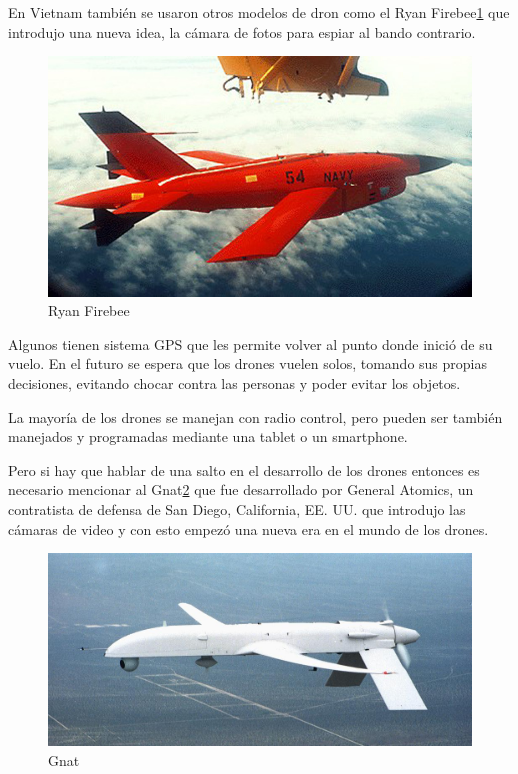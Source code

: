En Vietnam también se usaron otros modelos de dron como el Ryan Firebee\ref{fig:ryanfirebee} que introdujo una nueva idea, la cámara de fotos para espiar al bando contrario.

\begin{figure}[H]
  \centering
  \includegraphics[scale=0.65]{imagenes/ryanfirebee.jpg}
  \caption{Ryan Firebee}
  \label{fig:ryanfirebee}
\end{figure}

Algunos tienen sistema GPS que les permite volver al punto donde inició de su vuelo. En el futuro se espera que los drones vuelen solos, tomando sus propias decisiones, evitando chocar contra las personas y poder evitar los objetos.

La mayoría de los drones se manejan con radio control, pero pueden ser también manejados y programadas mediante una tablet o un smartphone.

Pero si hay que hablar de una salto en el desarrollo de los drones entonces es necesario mencionar al Gnat\ref{fig:gnat} que fue desarrollado por General Atomics, un contratista de defensa de San Diego, California, EE. UU. que introdujo las cámaras de video y con esto empezó una nueva era en el mundo de los drones.

\begin{figure}[H]
  \centering
  \includegraphics[scale=0.4]{imagenes/gnat.jpg}
  \caption{Gnat}
  \label{fig:gnat}
\end{figure}

